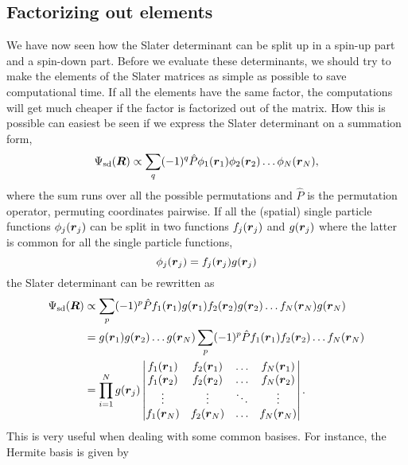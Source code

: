 \subsection{Factorizing out elements} \label{sec:factorizing}
We have now seen how the Slater determinant can be split up in a spin-up part and a spin-down part. Before we evaluate these determinants, we should try to make the elements of the Slater matrices as simple as possible to save computational time. If all the elements have the same factor, the computations will get much cheaper if the factor is factorized out of the matrix. How this is possible can easiest be seen if we express the Slater determinant on a summation form,
\begin{equation}
\Psi_{\text{sd}}(\boldsymbol{{R}})\propto\sum_{q}(-1)^q\hat{P}\phi_1(\boldsymbol{{r}}_1)\phi_2(\boldsymbol{{r}}_2)\hdots\phi_N(\boldsymbol{{r}}_N),
\label{eq:slatersum}
\end{equation}
where the sum runs over all the possible permutations and $\hat{P}$ is the permutation operator, permuting coordinates pairwise. If all the (spatial) single particle functions $\phi_j(\boldsymbol{{r}}_j)$ can be split in two functions $f_j(\boldsymbol{{r}}_j)$ and $g(\boldsymbol{{r}}_j)$ where the latter is common for all the single particle functions,
\begin{equation}
\phi_j(\boldsymbol{{r}}_j)=f_j(\boldsymbol{{r}}_j)g(\boldsymbol{{r}}_j)
\end{equation}
the Slater determinant can be rewritten as
\begin{equation}
\begin{aligned}
\Psi_{\text{sd}}(\boldsymbol{{R}})&\propto\sum_{p}(-1)^p\hat{P}f_1(\boldsymbol{{r}}_1)g(\boldsymbol{{r}}_1)f_2(\boldsymbol{{r}}_2)g(\boldsymbol{{r}}_2)\hdots f_N(\boldsymbol{{r}}_N)g(\boldsymbol{{r}}_N)\\
&=g(\boldsymbol{{r}}_1)g(\boldsymbol{{r}}_2)\hdots g(\boldsymbol{{r}}_N)\sum_{p}(-1)^p\hat{P}f_1(\boldsymbol{{r}}_1)f_2(\boldsymbol{{r}}_2)\hdots f_N(\boldsymbol{{r}}_N)\\
&=\prod_{i=1}^Ng(\boldsymbol{{r}}_j)
\begin{vmatrix}
f_1(\boldsymbol{r}_1) & f_2(\boldsymbol{r}_1) & \hdots & f_N(\boldsymbol{r}_1)\\
f_1(\boldsymbol{r}_2) & f_2(\boldsymbol{r}_2) & \hdots & f_N(\boldsymbol{r}_2)\\
\vdots & \vdots & \ddots & \vdots \\
f_1(\boldsymbol{r}_N) & f_2(\boldsymbol{r}_N) & \hdots & f_N(\boldsymbol{r}_N)
\end{vmatrix}.
\end{aligned}
\end{equation}
This is very useful when dealing with some common basises. For instance, the Hermite basis is given by 
